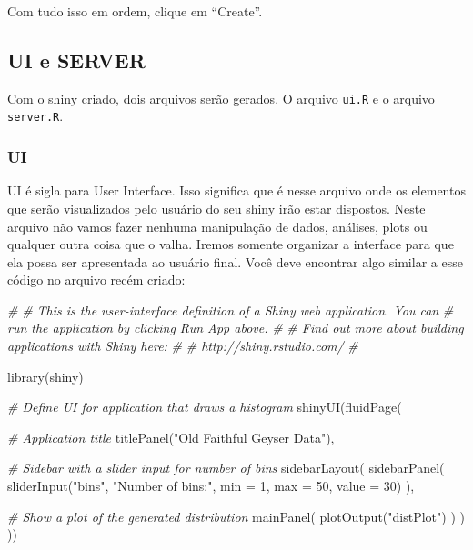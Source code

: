 \documentclass[
]{book}
\newenvironment{Shaded}{\begin{snugshade}}{\end{snugshade}}
\newcommand{\AttributeTok}[1]{\textcolor[rgb]{0.77,0.63,0.00}{#1}}
\newcommand{\CommentTok}[1]{\textcolor[rgb]{0.56,0.35,0.01}{\textit{#1}}}
\newcommand{\DecValTok}[1]{\textcolor[rgb]{0.00,0.00,0.81}{#1}}
\newcommand{\FunctionTok}[1]{\textcolor[rgb]{0.00,0.00,0.00}{#1}}
\newcommand{\NormalTok}[1]{#1}
\newcommand{\StringTok}[1]{\textcolor[rgb]{0.31,0.60,0.02}{#1}}
\begin{document}
Com tudo isso em ordem, clique em ``Create''.

\hypertarget{ui-e-server}{%
\subsection{UI e SERVER}\label{ui-e-server}}

Com o shiny criado, dois arquivos serão gerados. O arquivo \texttt{ui.R} e o arquivo \texttt{server.R}.

\hypertarget{ui}{%
\subsubsection{UI}\label{ui}}

UI é sigla para User Interface. Isso significa que é nesse arquivo onde os elementos que serão visualizados pelo usuário do seu shiny irão estar dispostos. Neste arquivo não vamos fazer nenhuma manipulação de dados, análises, plots ou qualquer outra coisa que o valha. Iremos somente organizar a interface para que ela possa ser apresentada ao usuário final. Você deve encontrar algo similar a esse código no arquivo recém criado:

\begin{Shaded}
\begin{Highlighting}[]
\CommentTok{\#}
\CommentTok{\# This is the user{-}interface definition of a Shiny web application. You can}
\CommentTok{\# run the application by clicking \textquotesingle{}Run App\textquotesingle{} above.}
\CommentTok{\#}
\CommentTok{\# Find out more about building applications with Shiny here:}
\CommentTok{\#}
\CommentTok{\#    http://shiny.rstudio.com/}
\CommentTok{\#}

\FunctionTok{library}\NormalTok{(shiny)}

\CommentTok{\# Define UI for application that draws a histogram}
\FunctionTok{shinyUI}\NormalTok{(}\FunctionTok{fluidPage}\NormalTok{(}

    \CommentTok{\# Application title}
    \FunctionTok{titlePanel}\NormalTok{(}\StringTok{"Old Faithful Geyser Data"}\NormalTok{),}

    \CommentTok{\# Sidebar with a slider input for number of bins}
    \FunctionTok{sidebarLayout}\NormalTok{(}
        \FunctionTok{sidebarPanel}\NormalTok{(}
            \FunctionTok{sliderInput}\NormalTok{(}\StringTok{"bins"}\NormalTok{,}
                        \StringTok{"Number of bins:"}\NormalTok{,}
                        \AttributeTok{min =} \DecValTok{1}\NormalTok{,}
                        \AttributeTok{max =} \DecValTok{50}\NormalTok{,}
                        \AttributeTok{value =} \DecValTok{30}\NormalTok{)}
\NormalTok{        ),}

        \CommentTok{\# Show a plot of the generated distribution}
        \FunctionTok{mainPanel}\NormalTok{(}
            \FunctionTok{plotOutput}\NormalTok{(}\StringTok{"distPlot"}\NormalTok{)}
\NormalTok{        )}
\NormalTok{    )}
\NormalTok{))}
\end{Highlighting}
\end{Shaded}
\end{document}
